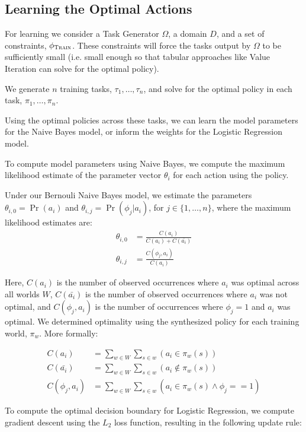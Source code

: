 \documentclass[11pt]{article}
\begin{document}
\subsection{Learning the Optimal Actions}
For learning we consider a Task Generator $\Omega$, a domain $D$, and a set of constraints, $\phi_{\textsc{Train}}$. These constraints will force the tasks output by $\Omega$ to be sufficiently small (i.e. small enough so that tabular approaches like Value Iteration can solve for the optimal policy).

We generate $n$ training tasks, $\tau_1, \ldots, \tau_n$, and solve for the optimal policy in each task, $\pi_1, \ldots, \pi_n$.

Using the optimal policies across these tasks, we can learn the model parameters for the Naive Bayes model, or inform the weights for the Logistic Regression model.

To compute model parameters using Naive Bayes, we compute
the maximum likelihood estimate of the parameter vector $\theta_i$ for
each action using the policy.

Under our Bernouli Naive Bayes model, we estimate the parameters
$\theta_{i,0} = \Pr(a_i)$ and $\theta_{i,j} = \Pr(\phi_j | a_i)$, for $j \in \{1, \ldots, n \}$, where the maximum likelihood estimates are:
\begin{align}
\theta_{i,0} &= \frac{C(a_i)}{C(a_i) + C(\bar{a_i})} \\
\theta_{i,j} &= \frac{C(\phi_j, a_i)}{C(a_i)}
\end{align}

Here, $C(a_i)$ is the number of observed occurrences where $a_i$ was optimal across all worlds $W$,
$C(\bar{a_i})$ is the number of observed occurrences where $a_i$ was not optimal,
and $C(\phi_j, a_i)$ is the number of occurrences where $\phi_j=1$ and $a_i$ was optimal.
We determined optimality using the synthesized policy for each training world, $\pi_w$. More formally:

\begin{align}
C(a_i) &= \sum_{w \in W} \sum_{s \in w} (a_i \in \pi_w(s)) \\
C(\bar{a_i}) &= \sum_{w \in W} \sum_{s \in w} (a_i \not \in \pi_w(s) ) \\
C(\phi_j, a_i) &= \sum_{w \in W} \sum_{s \in w} (a_i  \in \pi_w(s) \wedge \phi_j == 1)
\end{align}

To compute the optimal decision boundary for Logistic Regression, we compute gradient descent using the $L_2$ loss function, resulting in the following update rule:
\end{document}
